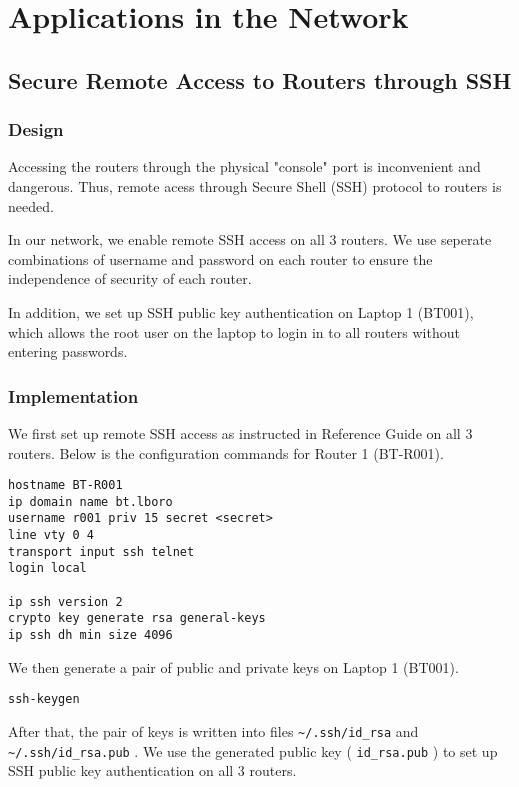 \chapter{Applications in the Network}
\label{chap:applications}

\section{Secure Remote Access to Routers through SSH}

\subsection{Design}

Accessing the routers through the physical "console" port is inconvenient and dangerous. Thus, remote acess through Secure Shell (SSH) protocol to routers is needed. 

In our network, we enable remote SSH access on all 3 routers. We use seperate combinations of username and password on each router to ensure the independence of security of each router.

In addition, we set up SSH public key authentication on Laptop 1 (BT001), which allows the root user on the laptop to login in to all routers without entering passwords.

\subsection{Implementation}

We first set up remote SSH access as instructed in Reference Guide on all 3 routers. Below is the configuration commands for Router 1 (BT-R001).

\begin{lstlisting}
hostname BT-R001
ip domain name bt.lboro
username r001 priv 15 secret <secret>
line vty 0 4
transport input ssh telnet
login local

ip ssh version 2
crypto key generate rsa general-keys
ip ssh dh min size 4096
\end{lstlisting}

We then generate a pair of public and private keys on Laptop 1 (BT001).

\begin{lstlisting}
ssh-keygen
\end{lstlisting}

After that, the pair of keys is written into files
\texttt{\textasciitilde{}/.ssh/id\_rsa} and
\texttt{\textasciitilde{}/.ssh/id\_rsa.pub} . We use the generated
public key ( \texttt{id\_rsa.pub} ) to set up SSH public key
authentication on all 3 routers.

